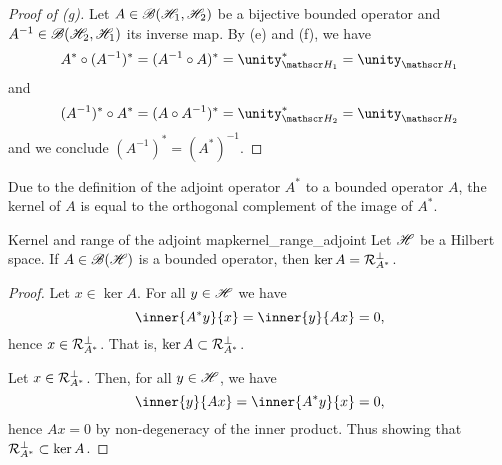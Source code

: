 \begin{proof}[Proof of (g)]
    Let \(A \in \mathscr{B}(\mathscr{H}_1, \mathscr{H}_2)\) be a bijective bounded operator and \(A^{-1} \in \mathscr{B}(\mathscr{H}_2, \mathscr{H}_1)\) its inverse map. By (e) and (f), we have
    \begin{equation*}
        A^* \circ (A^{-1})^* = (A^{-1} \circ A)^* = \unity_{\hilbert_1}^* = \unity_{\hilbert_1}
    \end{equation*}
    and
    \begin{equation*}
        (A^{-1})^* \circ A^* = (A \circ A^{-1})^* = \unity_{\hilbert_2}^* = \unity_{\hilbert_2}
    \end{equation*}
    and we conclude \((A^{-1})^* = (A^*)^{-1}\).
\end{proof}

Due to the definition of the adjoint operator \(A^*\) to a bounded operator \(A\), the kernel of \(A\) is equal to the orthogonal complement of the image of \(A^*\).
\begin{proposition}{Kernel and range of the adjoint map}{kernel_range_adjoint}
    Let \(\mathscr{H}\) be a Hilbert space. If \(A \in \mathscr{B}(\mathscr{H})\) is a bounded operator, then \(\ker A = \mathcal{R}_{A^{\ast}}^\perp\).
\end{proposition}
\begin{proof}
    Let \(x \in \ker A\). For all \(y \in \mathscr{H}\) we have
    \begin{equation*}
        \inner{A ^{\ast}y}{x} = \inner{y}{Ax} = 0,
    \end{equation*}
    hence \(x \in \mathcal{R}_{A ^{\ast}}^\perp\). That is, \(\ker A \subset \mathcal{R}_{A ^{\ast}}^\perp\).

    Let \(x \in \mathcal{R}_{A ^{\ast}}^\perp\). Then, for all \(y \in \mathscr{H}\), we have
    \begin{equation*}
        \inner{y}{Ax} = \inner{A ^{\ast}y}{x} = 0,
    \end{equation*}
    hence \(Ax = 0\) by non-degeneracy of the inner product. Thus showing that \(\mathcal{R}_{A ^{\ast}}^\perp \subset \ker A\).
\end{proof}

